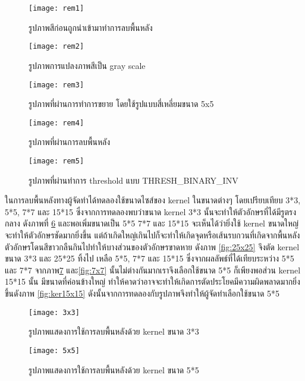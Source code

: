 \begin{figure}[H]
    \centering
    \texttt{[image: rem1]}
    \caption{รูปภาพสีก่อนถูกนำเข้ามาทำการลบพื้นหลัง}\label{fig:rem1}
\end{figure}

\begin{figure}[H]
    \centering
    \texttt{[image: rem2]}
    \caption{รูปภาพการแปลงภาพสีเป็น gray scale}\label{fig:rem2}
\end{figure}

\begin{figure}[H]
    \centering
    \texttt{[image: rem3]}
    \caption{รูปภาพที่ผ่านการทำการขยาย โดยใช้รูปแบบสี่เหลี่ยมขนาด 5x5}\label{fig:rem3}
\end{figure}

\begin{figure}[H]
    \centering
    \texttt{[image: rem4]}
    \caption{รูปภาพที่ผ่านการลบพื้นหลัง}\label{fig:rem4}
\end{figure}

\begin{figure}[H]
    \centering
    \texttt{[image: rem5]}
    \caption{รูปภาพที่ผ่านทำการ threshold แบบ THRESH\_BINARY\_INV}\label{fig:rem5}
\end{figure}

ในการลบพื้นหลังทางผู้จัดทำได้ทดลองใช้ขนาดไซส์ของ kernel ในขนาดต่างๆ โดยเปรียบเทียบ 3*3, 5*5, 7*7 และ 15*15 
ซึ่งจากการทดลองพบว่าขนาด kernel 3*3 นั้นจะทำให้ตัวอักษรที่ได้มีรูตรงกลาง ดังภาพที่ \ref{fig:3x3} และพอเพิ่มขนาดเป็น 5*5 7*7 
และ 15*15 จะเห็นได้ว่ายิ่งใช้ kernel ขนาดใหญ่ จะทำให้ตัวอักษรชัดมากยิ่งขึ้น แต่ถ้าเกิดใหญ่เกินไปก็จะทำให้เกิดจุดหรือเส้นรบกวนที่เกิดจากพื้นหลัง 
ตัวอักษรโดนสีขาวกลืนกินไปทำให้บางส่วนของตัวอักษรขาดหาย ดังภาพ \ref{fig:25x25} จึงตัด kernel ขนาด 3*3 และ 25*25 ทิ้งไป เหลือ 5*5, 7*7 
และ 15*15 ซึ่งจากผลลัพธ์ที่ได้เทียบระหว่าง 5*5 และ 7*7 จากภาพ\ref{fig:5x5} และ\ref{fig:7x7} นั้นไม่ต่างกันมากเราจึงเลือกใช้ขนาด 5*5 ก็เพียงพอส่วน kernel 15*15 นั้น มีขนาดที่ค่อนข้างใหญ่ 
ทำให้คาดว่าอาจจะทำให้เกิดการตัดประโยคมีความผิดพลาดมากยิ่งขึ้นดังภาพ \ref{fig:ker15x15} ดังนั้นจากการทดลองกับรูปภาพจึงทำให้ผู้จัดทำเลือกใช้ขนาด 5*5

\begin{figure}[H]
    \centering
    \texttt{[image: 3x3]}
    \caption{รูปภาพแสดงการใช้การลบพื้นหลังด้วย kernel ขนาด 3*3}\label{fig:3x3}
\end{figure}

\begin{figure}[H]
    \centering
    \texttt{[image: 5x5]}
    \caption{รูปภาพแสดงการใช้การลบพื้นหลังด้วย kernel ขนาด 5*5}\label{fig:5x5}
\end{figure}

